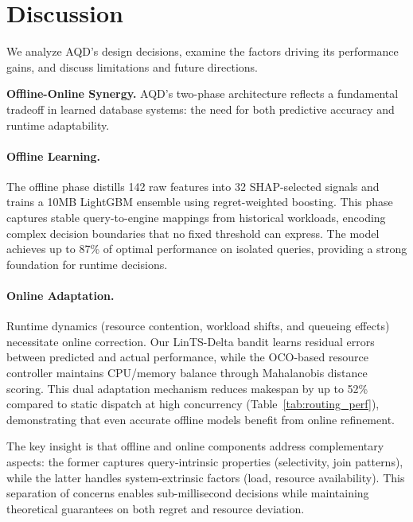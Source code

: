 \documentclass[sigconf, nonacm]{acmart}
\newcommand{\dispatcher}{AQD\xspace}
\begin{document}
\section{Discussion}\label{sec:discussion}

We analyze \dispatcher's design decisions, examine the factors driving its performance gains, and discuss limitations and future directions.

\vspace{1em}
\noindent
\textbf{Offline-Online Synergy.}
\dispatcher's two-phase architecture reflects a fundamental tradeoff in learned database systems: the need for both predictive accuracy and runtime adaptability.

\paragraph{Offline Learning.} The offline phase distills 142 raw features into 32 SHAP-selected signals and trains a 10MB LightGBM ensemble using regret-weighted boosting. This phase captures stable query-to-engine mappings from historical workloads, encoding complex decision boundaries that no fixed threshold can express. The model achieves up to 87\% of optimal performance on isolated queries, providing a strong foundation for runtime decisions.

\paragraph{Online Adaptation.} Runtime dynamics (resource contention, workload shifts, and queueing effects) necessitate online correction. Our LinTS-Delta bandit learns residual errors between predicted and actual performance, while the OCO-based resource controller maintains CPU/memory balance through Mahalanobis distance scoring. This dual adaptation mechanism reduces makespan by up to 52\% compared to static dispatch at high concurrency (Table~\ref{tab:routing_perf}), demonstrating that even accurate offline models benefit from online refinement.

The key insight is that offline and online components address complementary aspects: the former captures query-intrinsic properties (selectivity, join patterns), while the latter handles system-extrinsic factors (load, resource availability). This separation of concerns enables sub-millisecond decisions while maintaining theoretical guarantees on both regret and resource deviation.
\end{document}
